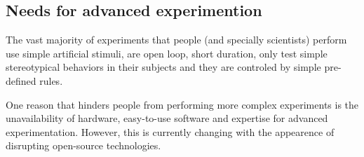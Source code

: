 \subsection{Needs for advanced experimention}

The vast majority of experiments that people (and specially scientists) perform
use simple artificial stimuli, are open loop, short duration, only test simple
stereotypical behaviors in their subjects and they are controled by simple
pre-defined rules.

One reason that hinders people from performing more complex experiments is the
unavailability of hardware, easy-to-use software and expertise for advanced
experimentation. However, this is currently changing with the appearence of
disrupting open-source technologies.


